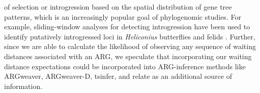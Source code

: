 \documentclass[11pt]{article}
\begin{document}
of selection or introgression based on the spatial distribution of gene tree 
patterns, which is an increasingly popular goal of phylogenomic studies. 
For example, sliding-window analyses for detecting introgression have 
been used to identify putatively introgressed loci in \emph{Heliconius} 
butterflies \citep{zhang2016genome} and felids \citep{li2019recombination}. 
Further, since we are able to calculate the likelihood of observing any sequence of waiting 
distances associated with an ARG, we speculate that incorporating our waiting distance 
expectations could be incorporated into ARG-inference methods like
ARGweaver, ARGweaver-D, tsinfer, and relate \citep{rasmussen2014genome, hubisz2020inference, kelleher2019inferring, speidel2019method} 
as an additional source of information. 




\end{document}
